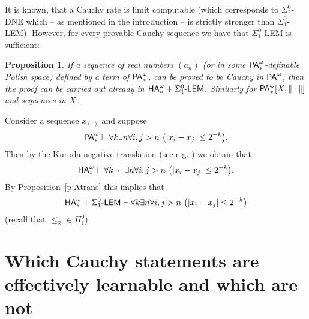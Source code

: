 \documentclass[1p]{elsarticle}
\newcommand{\usftext}[1]{\textsf{\upshape #1}}
\newcommand{\RR}{\ensuremath{\mathbb{R}}}
\newcommand{\ha}{\ensuremath{{\usftext{HA}}^\omega}} %
\newcommand{\pa}{\ensuremath{{\usftext{PA}}^\omega}} %
\newcommand{\LEM}{\ensuremath{\Sigma^0_1\usftext{-LEM}}}
\theoremstyle{plain}
\newtheorem{prop}[thm]{Proposition}
\theoremstyle{definition}
\theoremstyle{remark}
\renewenvironment{proof}[1][]{\noindent{\bf Proof{#1}. }}{\nopagebreak[4]{\hspace*{\fill}
  $\Box$              %
 }{\vspace{2ex}}}
\theoremstyle{definition}
\begin{document}
{It is known, that a Cauchy rate is limit computable (which corresponds 
to $\Sigma^0_2$-DNE which -- as mentioned in the introduction -- is 
strictly stronger than $\Sigma^0_1$-LEM). However, for every provable   
Cauchy sequence we have that $\Sigma^0_1$-LEM is sufficient:
\begin{prop}\label{p:limComp}
If a sequence of real numbers $(a_n)$ (or in some $\pa_*$-definable Polish 
space) defined by a term of 
$\pa_*$, can be proved to be Cauchy in $\pa$, then the proof can be carried 
out already in $\ha_*+\LEM$. Similarly for $\pa_*[X,\|\cdot\|]$ and 
sequences in 
$X.$
\end{prop}
\begin{proof}
Consider a sequence $x_{(\cdot)}$ and suppose
\[ \pa_*\vdash \forall k\exists n\forall i,j>n\ 
\big(| x_i - x_j| \leq 2^{-k}\big). \]
Then by the Kuroda negative translation (see e.g. \cite{Kohlenbach(book)}) 
we obtain that
\[ \ha_*\vdash \forall k\neg\neg\exists n\forall i,j>n\ \big(| 
x_i - x_j| \leq 2^{-k}\big). \]
By Proposition~\ref{p:Atrans} this implies that
\[ \ha_*+\LEM\vdash \forall k\exists n\forall i,j>n\ \big(| x_i - x_j| 
\leq 2^{-k}\big) \] (recall that $\le_{\RR}\in\Pi^0_1$).
\end{proof}

\section{Which Cauchy statements are effectively learnable and which are not}

}
\end{document}
